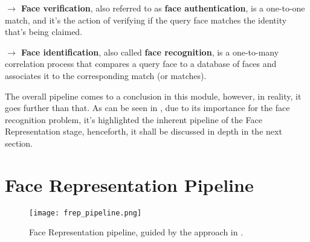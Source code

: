 \documentclass[class=report, crop=false, a4paper, 12pt]{standalone}
\begin{document}
\vspace{0.7\baselineskip}
\noindent\textbf{$\rightarrow$ Face verification}, also referred to as \textbf{face authentication}, is a one-to-one match, and it's the action of verifying if the query face matches the identity that's being claimed.  \autocite{liHandbookFaceRecognition2011}

\vspace{0.7\baselineskip}
\noindent\textbf{$\rightarrow$ Face identification}, also called \textbf{face recognition}, is a one-to-many correlation process that compares a query face to a database of faces and associates it to the corresponding match (or matches).  \autocite{liHandbookFaceRecognition2011}



\vspace{0.7\baselineskip}
\par The overall pipeline comes to a conclusion in this module, however, in reality, it goes further than that. As can be seen in , due to its importance for the face recognition problem, it's highlighted the inherent pipeline of the Face Representation stage, henceforth, it shall be discussed in depth in the next section.

\vspace{\baselineskip}

\newpage
\section{Face Representation Pipeline}
\begin{figure}[!h]
    \centering
    \texttt{[image: frep\_pipeline.png]}
    \caption[Pipeline]{Face Representation pipeline, guided by the approach in \autocite{wangDeepFaceRecognition2021}.}
    \label{fig:frep pipeline}
\end{figure}
\end{document}
